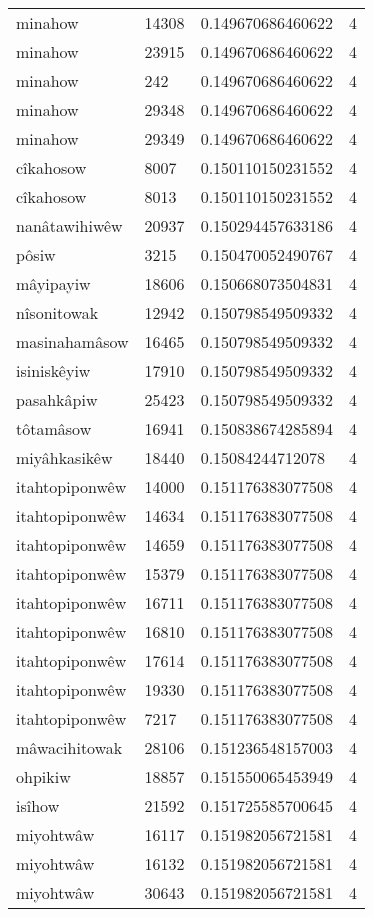 \begin{longtable}{llll}
minahow & 14308 & 0.149670686460622 & 4 \\
minahow & 23915 & 0.149670686460622 & 4 \\
minahow & 242 & 0.149670686460622 & 4 \\
minahow & 29348 & 0.149670686460622 & 4 \\
minahow & 29349 & 0.149670686460622 & 4 \\
cîkahosow & 8007 & 0.150110150231552 & 4 \\
cîkahosow & 8013 & 0.150110150231552 & 4 \\
nanâtawihiwêw & 20937 & 0.150294457633186 & 4 \\
pôsiw & 3215 & 0.150470052490767 & 4 \\
mâyipayiw & 18606 & 0.150668073504831 & 4 \\
nîsonitowak & 12942 & 0.150798549509332 & 4 \\
masinahamâsow & 16465 & 0.150798549509332 & 4 \\
isiniskêyiw & 17910 & 0.150798549509332 & 4 \\
pasahkâpiw & 25423 & 0.150798549509332 & 4 \\
tôtamâsow & 16941 & 0.150838674285894 & 4 \\
miyâhkasikêw & 18440 & 0.15084244712078 & 4 \\
itahtopiponwêw & 14000 & 0.151176383077508 & 4 \\
itahtopiponwêw & 14634 & 0.151176383077508 & 4 \\
itahtopiponwêw & 14659 & 0.151176383077508 & 4 \\
itahtopiponwêw & 15379 & 0.151176383077508 & 4 \\
itahtopiponwêw & 16711 & 0.151176383077508 & 4 \\
itahtopiponwêw & 16810 & 0.151176383077508 & 4 \\
itahtopiponwêw & 17614 & 0.151176383077508 & 4 \\
itahtopiponwêw & 19330 & 0.151176383077508 & 4 \\
itahtopiponwêw & 7217 & 0.151176383077508 & 4 \\
mâwacihitowak & 28106 & 0.151236548157003 & 4 \\
ohpikiw & 18857 & 0.151550065453949 & 4 \\
isîhow & 21592 & 0.151725585700645 & 4 \\
miyohtwâw & 16117 & 0.151982056721581 & 4 \\
miyohtwâw & 16132 & 0.151982056721581 & 4 \\
miyohtwâw & 30643 & 0.151982056721581 & 4 \\

\end{longtable}
